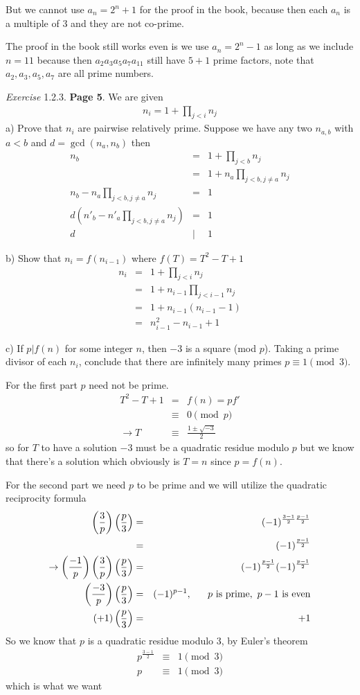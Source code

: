 \documentclass[aps,preprint,preprintnumbers,nofootinbib,showpacs,prd]{revtex4-1}
\newcommand{\nbea}{\begin{eqnarray*}}
\newcommand{\neea}{\end{eqnarray*}}
\begin{document}
But we cannot use $a_n = 2^n + 1$ for the proof in the book, because then each $a_n$ is a multiple of 3 and they are not co-prime.

The proof in the book still works even is we use $a_n = 2^n - 1$ as long as we include $n=11$ because then $a_2a_3a_5a_7a_{11}$ still have $5+1$ prime factors, note that $a_2,a_3,a_5,a_7$ are all prime numbers.

{\it Exercise} 1.2.3. {\bf Page 5}. We are given
%
\nbea
n_i = 1 + \prod_{j<i} n_j
\neea
%
a) Prove that $n_i$ are pairwise relatively prime. Suppose we have any two $n_{a,b}$ with $a < b$ and $d = \gcd(n_a,n_b)$ then
%
\nbea
n_b & = & 1 + \prod_{j < b} n_j \\
& = & 1 + n_a \prod_{j < b, j\ne a} n_j \\
n_b - n_a \prod_{j < b, j\ne a} n_j & = & 1 \\
d\left(n'_b - n'_a \prod_{j < b, j\ne a} n_j\right) & = & 1 \\
d &|& 1
\neea
%

b) Show that $n_i = f(n_{i-1})$ where $f(T) = T^2 - T + 1$
%
\nbea
n_i & = & 1 + \prod_{j < i} n_j \\
& = & 1 + n_{i-1}\prod_{j < i-1} n_j \\
& = & 1 + n_{i-1}(n_{i-1} - 1) \\
& = & n^2_{i-1} - n_{i-1} + 1
\neea
%

c) If $p | f(n)$ for some integer $n$, then $-3$ is a square (mod $p$). Taking a prime divisor of each $n_i$, conclude that there are inﬁnitely many primes $p \equiv 1 \pmod{3}$.

For the first part $p$ need not be prime.
%
\nbea
T^2 - T + 1 & = & f(n) = p f'\\
& \equiv & 0 \pmod{p} \\
\to T & \equiv & \frac{1 \pm \sqrt{-3}}{2} 
\neea
%
so for $T$ to have a solution $-3$ must be a quadratic residue modulo $p$ but we know that there's a solution which obviously is $T=n$ since $p=f(n)$.

For the second part we need $p$ to be prime and we will utilize the quadratic reciprocity formula
%
\nbea
\left(\frac{3}{p}\right) \left(\frac{p}{3}\right) & = & (-1)^{\frac{3-1}{2}\frac{p-1}{2}} \\
& = & (-1)^{\frac{p-1}{2}} \\
\to \left(\frac{-1}{p}\right) \left(\frac{3}{p}\right) \left(\frac{p}{3}\right) & = &  (-1)^{\frac{p-1}{2}} (-1)^{\frac{p-1}{2}} \\
\left(\frac{-3}{p}\right) \left(\frac{p}{3}\right) & = & (-1)^{p-1}, ~~~~~ p {\rm~is~prime}, ~p-1~{\rm is~even} \\
(+1)\left(\frac{p}{3}\right) & = &  +1
\neea
%
So we know that $p$ is a quadratic residue modulo 3, by Euler's theorem
%
\nbea
p^{\frac{3-1}{2}} & \equiv & 1 \pmod{3} \\
p & \equiv & 1 \pmod{3}
\neea
% 
which is what we want
\end{document}
